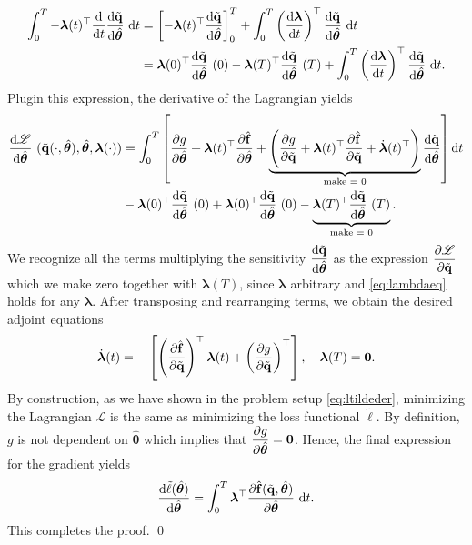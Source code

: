 \begin{align*}
    \int_0^T -\bm{\lambda}(t)^{\top}\dv{t}\dv{\tilde{\mathbf{q}}}{\hat{\bm{\theta}}}~\dd t &= \left[ -\bm{\lambda}(t)^{\top}\dv{\tilde{\mathbf{q}}}{\hat{\bm{\theta}}}\right]_0^T + \int_0^T \left( \dv{\bm{\lambda}}{t}\right)^{\top}\dv{\tilde{\mathbf{q}}}{\hat{\bm{\theta}}}~\dd t\\
    &= \bm{\lambda}(0)^{\top}\dv{\tilde{\mathbf{q}}}{\hat{\bm{\theta}}}~(0) - \bm{\lambda}(T)^{\top}\dv{\tilde{\mathbf{q}}}{\hat{\bm{\theta}}}~(T) + \int_0^T \left( \dv{\bm{\lambda}}{t}\right)^{\top}\dv{\tilde{\mathbf{q}}}{\hat{\bm{\theta}}}~\dd t.
\end{align*}
Plugin this expression, the derivative of the Lagrangian yields\\
\begin{align*}
   \dv{\mathscr{L}}{\hat{\bm{\theta}}}~(\tilde{\mathbf{q}}(\cdot,\hat{\bm{\theta}}),\hat{\bm{\theta}},\bm{\lambda}(\cdot)) &= \int_0^T\left[ \pdv{g}{\hat{\bm{\theta}}} + \bm{\lambda}(t)^{\top} \pdv{\hat{\mathbf{f}}}{\hat{\bm{\theta}}} + \underbrace{\left( \pdv{g}{\tilde{\mathbf{q}}} + \bm{\lambda}(t)^{\top}\pdv{\hat{\mathbf{f}}}{\tilde{\mathbf{q}}}+ \dot{\bm{\lambda}}(t)^{\top}\right)}_{\text{make = 0}} \dv{\tilde{\mathbf{q}}}{\hat{\bm{\theta}}} \right]\dd t \\
   & - \bm{\lambda}(0)^{\top}\dv{\tilde{\mathbf{q}}}{\hat{\bm{\theta}}}~(0)+\bm{\lambda}(0)^{\top}\dv{\tilde{\mathbf{q}}}{\hat{\bm{\theta}}}~(0) - \underbrace{\bm{\lambda}(T)^{\top}\dv{\tilde{\mathbf{q}}}{\hat{\bm{\theta}}}~(T)}_{\text{make = 0}}.
\end{align*}
We recognize all the terms multiplying the sensitivity $\displaystyle\dv{\tilde{\mathbf{q}}}{\hat{\bm{\theta}}}$ as the expression $\displaystyle\pdv{\mathscr{L}}{\tilde{\mathbf{q}}}$ which we make zero together with $\bm{\lambda}(T)$, since $\bm{\lambda}$ arbitrary and \eqref{eq:lambdaeq} holds for any $\bm{\lambda}$.
 After transposing and rearranging terms, we obtain the desired adjoint equations\\
\begin{equation*}
    \dot{\bm{\lambda}}(t) = -\left[ \left(\pdv{\hat{\mathbf{f}}}{\tilde{\mathbf{q}}}\right)^{\top} \bm{\lambda}(t)  + \left(\pdv{g}{\tilde{\mathbf{q}}}\right)^{\top}\right], \quad\bm{\lambda}(T) = \bm{0}.
\end{equation*}
By construction, as we have shown in the problem setup \eqref{eq:ltildeder},  minimizing the Lagrangian $\mathscr{L}$ is the same as minimizing the loss functional $\tilde\ell$. By definition, $g$ is not dependent on $\hat{\bm{\theta}}$ which implies that $\displaystyle\pdv{g}{\hat{\bm{\theta}}}=\bm{0}$. Hence, the final expression for the gradient yields\\
\begin{equation*}
    \dv{\tilde\ell(\hat{\bm{\theta}})}{\hat{\bm{\theta}}} = \int_0^T \bm{\lambda}^{\top} \pdv{\hat{\mathbf{f}}(\tilde{\mathbf{q}},\hat{\bm{\theta}})}{\hat{\bm{\theta}}}~\dd t.
\end{equation*}
This completes the proof.
\qed

